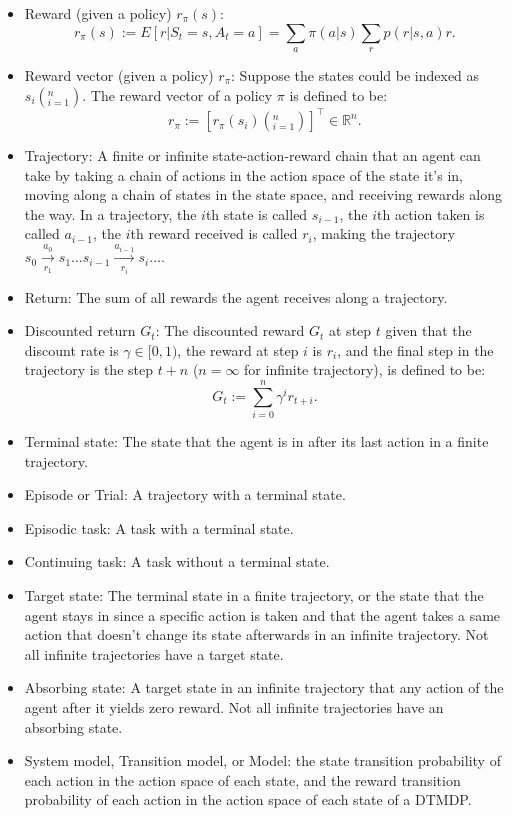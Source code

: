 \documentclass[a4paper,12pt]{report}
\begin{document}
\begin{itemize}
\item Reward (given a policy) $r_{\pi}(s)$:
\[r_{\pi}(s):= E[r|S_t=s,A_t=a]=\sum_a\pi(a|s)\sum_rp(r|s,a)r.\]
\item Reward vector (given a policy) $r_{\pi}$: Suppose the states could be indexed as $s_i\left(_{i=1}^n\right)$. The reward vector of a policy $\pi$ is defined to be:
\[r_{\pi}:=[r_{\pi}(s_i)\left(_{i=1}^n\right)]^{\top}\in\mathbb{R}^n.\]
\item Trajectory: A finite or infinite state-action-reward chain that an agent can take by taking a chain of actions in the action space of the state it's in, moving along a chain of states in the state space, and receiving rewards along the way. In a trajectory, the $i$th state is called $s_{i-1}$, the $i$th action taken is called $a_{i-1}$, the $i$th reward received is called $r_i$, making the trajectory $s_0\xrightarrow[r_1]{a_0}s_1\ldots s_{i-1}\xrightarrow[r_i]{a_{i-1}}s_i\ldots$.
\item Return: The sum of all rewards the agent receives along a trajectory.
\item Discounted return $G_t$: The discounted reward $G_t$ at step $t$ given that the discount rate is $\gamma\in[0,1)$, the reward at step $i$ is $r_i$, and the final step in the trajectory is the step $t+n$ ($n=\infty$ for infinite trajectory), is defined to be:
\[G_t:=\sum_{i=0}^n\gamma^ir_{t+i}.\]
\item Terminal state: The state that the agent is in after its last action in a finite trajectory.
\item Episode or Trial: A trajectory with a terminal state.
\item Episodic task: A task with a terminal state.
\item Continuing task: A task without a terminal state.
\item Target state: The terminal state in a finite trajectory, or the state that the agent stays in since a specific action is taken and that the agent takes a same action that doesn't change its state afterwards in an infinite trajectory. Not all infinite trajectories have a target state.
\item Absorbing state: A target state in an infinite trajectory that any action of the agent after it yields zero reward. Not all infinite trajectories have an absorbing state.
\item System model, Transition model, or Model: the state transition probability of each action in the action space of each state, and the reward transition probability of each action in the action space of each state of a DTMDP.

\end{itemize}
\end{document}
